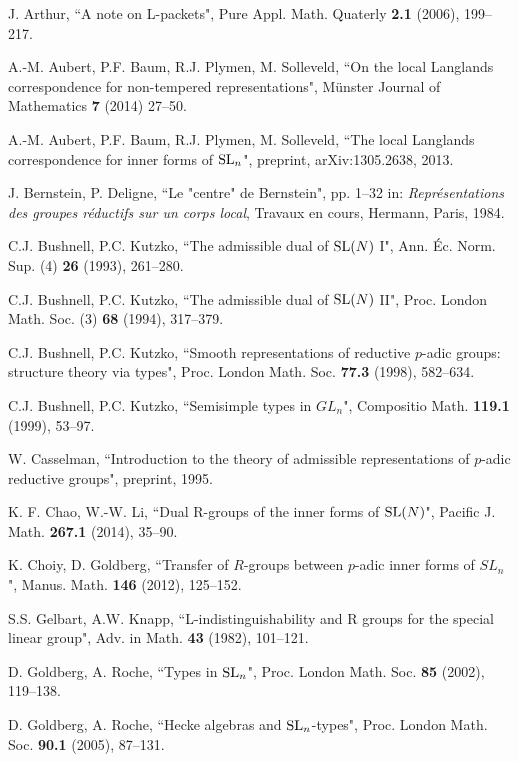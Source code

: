 \documentclass[11pt]{amsart}
\theoremstyle{definition}
\begin{document}
\begin{thebibliography}{99}

 J. Arthur, ``A note on L-packets",
Pure Appl. Math. Quaterly {\bf 2.1} (2006), 199--217.

 A.-M. Aubert, P.F. Baum, R.J. Plymen, M. Solleveld,	
``On the local Langlands correspondence for non-tempered representations",
M\"unster Journal of Mathematics {\bf 7} (2014) 27--50.

 A.-M. Aubert, P.F. Baum, R.J. Plymen, M. Solleveld,
``The local Langlands correspondence for inner forms of ${{\rm SL}}_n$",
preprint, arXiv:1305.2638, 2013.

 J. Bernstein, P. Deligne, ``Le "centre" de Bernstein",
pp. 1--32 in: \emph{Repr\'esentations des groupes r\'eductifs sur un corps local},
Travaux en cours, Hermann, Paris, 1984.

 C.J. Bushnell, P.C. Kutzko, ``The admissible dual of
${{\rm SL}}(N)$ I", Ann. \'Ec. Norm. Sup. (4) {\bf 26} (1993), 261--280.

 C.J. Bushnell, P.C. Kutzko, ``The admissible dual of
${{\rm SL}}(N)$ II", Proc. London Math. Soc. (3) {\bf 68} (1994), 317--379.

 C.J. Bushnell, P.C. Kutzko, ``Smooth representations of 
reductive $p$-adic groups: structure theory via types",
Proc. London Math. Soc. {\bf 77.3} (1998), 582--634.

 C.J. Bushnell, P.C. Kutzko, 
``Semisimple types in $GL_n$", Compositio Math. {\bf 119.1} (1999), 53--97.

 W. Casselman, ``Introduction to the theory of admissible 
representations of $p$-adic reductive groups", preprint, 1995.

 K. F. Chao, W.-W. Li,
``Dual R-groups of the inner forms of ${{\rm SL}}(N)$",
Pacific J. Math. {\bf 267.1} (2014), 35--90.

 K. Choiy, D. Goldberg,
``Transfer of $R$-groups between $p$-adic inner forms of $SL_n$",
Manus. Math. {\bf 146} (2012), 125--152.

 S.S. Gelbart, A.W. Knapp, ``L-indistinguishability and 
R groups for the special linear group", Adv. in Math. {\bf 43} (1982), 101--121.

 D. Goldberg, A. Roche, ``Types in ${{\rm SL}}_n$",
Proc. London Math. Soc. {\bf 85} (2002), 119--138.
  
 D. Goldberg, A. Roche, ``Hecke algebras and ${{\rm SL}}_n$-types",
Proc. London Math. Soc. {\bf 90.1} (2005), 87--131.


\end{thebibliography}
\end{document}
